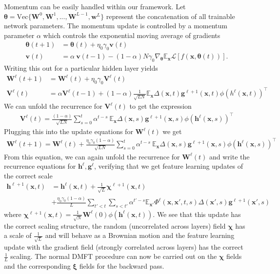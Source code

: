 \documentclass{article} %
\def\h{\bm h}
\def\x{\bm x}
\def\g{\bm g}
\def\w{\bm w}
\def\W{\bm W}
\begin{document}
Momentum can be easily handled within our framework. Let $\bm\theta = \text{Vec}\{ \W^0,\W^1 , ... , \W^{L-1}, \w^L \}$ represent the concatenation of all trainable network parameters. The momentum update is controlled by a momentum parameter $\alpha$ which controls the exponential moving average of gradients
\begin{align}
    \bm\theta(t+1) &= \bm\theta(t) + \eta_0 \gamma_0 \bm v(t) \nonumber
    \\
    \bm v(t) &= \alpha \ \bm v(t-1) - (1-\alpha) N \gamma_0 \nabla_{\bm\theta} \mathbb{E}_{\x} \mathcal{L}[f(\x,\bm\theta(t))] .
\end{align}
Writing this out for a particular hidden layer yields
\begin{align}
    \W^{\ell}(t+1) &= \bm W^\ell(t) + \eta_0 \gamma_0  \bm V^\ell(t) \nonumber
    \\
    \bm V^\ell(t) &=  \alpha \bm V^\ell(t-1) + (1-\alpha) \frac{1}{\sqrt{L N}} \mathbb{E}_{\x} \Delta(\x,t) \g^{\ell+1}(\x,t) \phi(h^\ell(\x,t))^\top 
\end{align}
We can unfold the recurrence for $\bm V^\ell(t)$ to get the expression
\begin{align}
    \bm V^\ell(t) = \frac{(1-\alpha)}{\sqrt{LN}} \sum_{s=0}^{t} \alpha^{t-s} \ \mathbb{E}_{\x} \Delta(\x,s) \g^{\ell+1}(\x,s) \phi(\h^\ell(\x,s))^\top
\end{align}
Plugging this into the update equations for $\W^\ell(t)$ we get
\begin{align}
    \W^\ell(t+1) =  \W^\ell(t) + \frac{\eta_0 \gamma_0 (1-\alpha)}{\sqrt{LN}} \sum_{s=0}^{t} \alpha^{t-s} \ \mathbb{E}_{\x} \Delta(\x,s) \g^{\ell+1}(\x,s) \phi(\h^\ell(\x,s))^\top
 \end{align}
From this equation, we can again unfold the recurrence for $\W^\ell(t)$ and write the recurrence equations for $\h^\ell, \g^\ell$, verifying that we get feature learning updates of the correct scale
\begin{align}
    \h^{\ell+1}(\x,t) &= \h^{\ell}(\x,t) + \frac{1}{\sqrt L} \bm\chi^{\ell+1}(\x,t) \nonumber
    \\
    &+ \frac{\eta_0 \gamma_0 (1-\alpha)}{L} \sum_{t'<t} \sum_{s < t'} \alpha^{t'-s} \mathbb{E}_{\x'} \Phi^{\ell}(\x,\x',t,s) \Delta(\x',s) \g^{\ell+1}(\x',s) 
\end{align}
where $\bm\chi^{\ell+1}(\x,t) = \frac{1}{\sqrt N} \W^{\ell}(0) \phi(\h^{\ell}(\x,t))$. We see that this update has the correct scaling structure, the random (uncorrelated across layers) field $\bm\chi$ has a scale of $\frac{1}{\sqrt L}$ and will behave as a Brownian motion and the feature learning update with the gradient field (strongly correlated across layers) has the correct $\frac{1}{L}$ scaling. The normal DMFT procedure can now be carried out on the $\bm\chi$ fields and the corresponding $\bm\xi$ fields for the backward pass.
\end{document}
